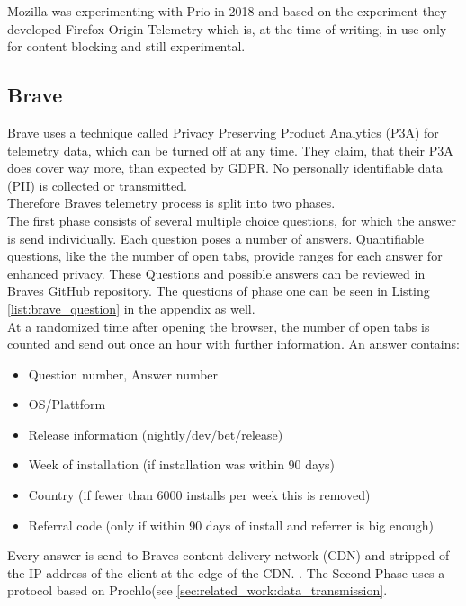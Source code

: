     Mozilla was experimenting with Prio in 2018 \cite{helmer_testing_2018} and based on the experiment they developed Firefox Origin Telemetry\cite{englehardt_next_2019} which is, at the time of writing, in use only for content blocking and still experimental\cite{noauthor_origin_nodate}.\\


\subsection{Brave}
    Brave uses a technique called Privacy Preserving Product Analytics (P3A) for telemetry data, which can be turned off at any time.
    They claim, that their P3A does cover way more, than expected by GDPR. No personally identifiable data (PII) is collected or transmitted.\\
    Therefore Braves telemetry process is split into two phases.\\
    The first phase consists of several multiple choice questions, for which the answer is send individually.
    Each question poses a number of answers. Quantifiable questions, like the the number of open tabs, provide ranges for each answer for enhanced privacy\cite{brave_privacy-preserving_2019}. These Questions and possible answers can be reviewed in Braves GitHub repository\cite{brave_software_inc_brave-browser_2019}.
    The questions of phase one can be seen in Listing \ref{list:brave_question} in the appendix as well.\\
    At a randomized time after opening the browser, the number of open tabs is counted and send out once an hour with further information\cite{brave_privacy-preserving_2019}.
    An answer contains:
    \begin{itemize}
        \item Question number, Answer number
        \item OS/Plattform
        \item Release information (nightly/dev/bet/release)
        \item Week of installation (if installation was within 90 days)
        \item Country (if fewer than 6000 installs per week this is removed)
        \item Referral code (only if within 90 days of install and referrer is big enough)
    \end{itemize}
    Every answer is send to Braves content delivery network (CDN) and stripped of the IP address of the client at the edge of the CDN\cite{brave_privacy-preserving_2019}.
    . 
    The Second Phase uses a protocol based on Prochlo(see \ref{sec:related_work:data_transmission}. 
    
